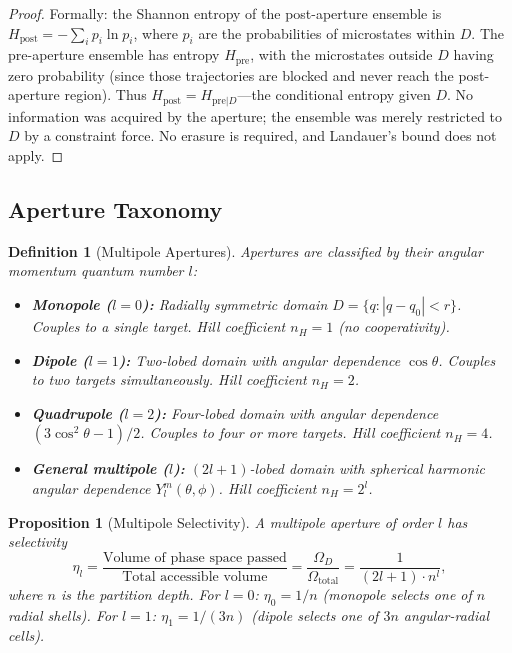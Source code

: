 \documentclass[twocolumn,10pt]{article}
\newtheorem{proposition}[theorem]{Proposition}
\newtheorem{definition}[theorem]{Definition}
\theoremstyle{remark}
\begin{document}
\begin{proof}
Formally: the Shannon entropy \cite{shannon1948} of the post-aperture ensemble is $H_{\mathrm{post}} = -\sum_i p_i \ln p_i$, where $p_i$ are the probabilities of microstates within $D$. The pre-aperture ensemble has entropy $H_{\mathrm{pre}}$, with the microstates outside $D$ having zero probability (since those trajectories are blocked and never reach the post-aperture region). Thus $H_{\mathrm{post}} = H_{\mathrm{pre}|D}$---the conditional entropy given $D$. No information was acquired by the aperture; the ensemble was merely restricted to $D$ by a constraint force. No erasure is required, and Landauer's bound does not apply.
\end{proof}

\subsection{Aperture Taxonomy}

\begin{definition}[Multipole Apertures]
\label{def:multipole}
Apertures are classified by their angular momentum quantum number $l$:
\begin{itemize}
\item \textbf{Monopole ($l = 0$):} Radially symmetric domain $D = \{q : |q - q_0| < r\}$. Couples to a single target. Hill coefficient $n_H = 1$ (no cooperativity).
\item \textbf{Dipole ($l = 1$):} Two-lobed domain with angular dependence $\cos\theta$. Couples to two targets simultaneously. Hill coefficient $n_H = 2$.
\item \textbf{Quadrupole ($l = 2$):} Four-lobed domain with angular dependence $(3\cos^2\theta - 1)/2$. Couples to four or more targets. Hill coefficient $n_H = 4$.
\item \textbf{General multipole ($l$):} $(2l+1)$-lobed domain with spherical harmonic angular dependence $Y_l^m(\theta, \phi)$. Hill coefficient $n_H = 2^l$.
\end{itemize}
\end{definition}

\begin{proposition}[Multipole Selectivity]
\label{prop:selectivity}
A multipole aperture of order $l$ has selectivity
\begin{equation}
\eta_l = \frac{\text{Volume of phase space passed}}{\text{Total accessible volume}} = \frac{\Omega_D}{\Omega_{\mathrm{total}}} = \frac{1}{(2l+1) \cdot n^l},
\end{equation}
where $n$ is the partition depth. For $l = 0$: $\eta_0 = 1/n$ (monopole selects one of $n$ radial shells). For $l = 1$: $\eta_1 = 1/(3n)$ (dipole selects one of $3n$ angular-radial cells).
\end{proposition}
\end{document}
